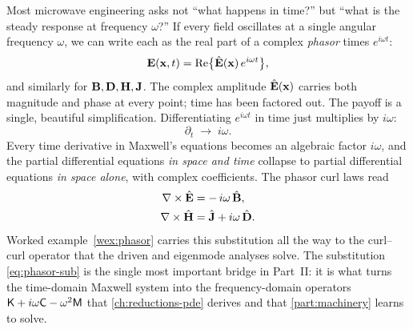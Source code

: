 Most microwave engineering asks not ``what happens in time?'' but ``what is the
steady response at frequency $\omega$?'' If every field oscillates at a single
angular frequency $\omega$, we can write each as the real part of a complex
\emph{phasor} times $e^{i\omega t}$:
\[
  \mathbf{E}(\mathbf{x},t) = \operatorname{Re}\!\big\{\hat{\mathbf{E}}(\mathbf{x})\,e^{i\omega t}\big\},
\]
and similarly for $\mathbf{B},\mathbf{D},\mathbf{H},\mathbf{J}$. The complex amplitude $\hat{\mathbf{E}}(\mathbf{x})$
carries both magnitude and phase at every point; time has been factored out.
The payoff is a single, beautiful simplification. Differentiating
$e^{i\omega t}$ in time just multiplies by $i\omega$:
\begin{equation}
  \partial_t \;\longrightarrow\; i\omega. \label{eq:phasor-sub}
\end{equation}
Every time derivative in Maxwell's equations becomes an algebraic factor
$i\omega$, and the partial differential equations \emph{in space and time}
collapse to partial differential equations \emph{in space alone}, with complex
coefficients. The phasor curl laws read
\begin{align}
  \nabla\times\hat{\mathbf{E}} &= -\,i\omega\,\hat{\mathbf{B}}, \label{eq:faraday-phasor}\\
  \nabla\times\hat{\mathbf{H}} &= \hat{\mathbf{J}} + i\omega\,\hat{\mathbf{D}}. \label{eq:ampere-phasor}
\end{align}
Worked example~\ref{wex:phasor} carries this substitution all the way to the curl--curl
operator that the driven and eigenmode analyses solve. The substitution
\eqref{eq:phasor-sub} is the single most important bridge in Part~II: it is
what turns the time-domain Maxwell system into the frequency-domain operators
$\mathsf{K} + i\omega\mathsf{C} - \omega^2\mathsf{M}$ that \cref{ch:reductions-pde} derives
and that \cref{part:machinery} learns to solve.

